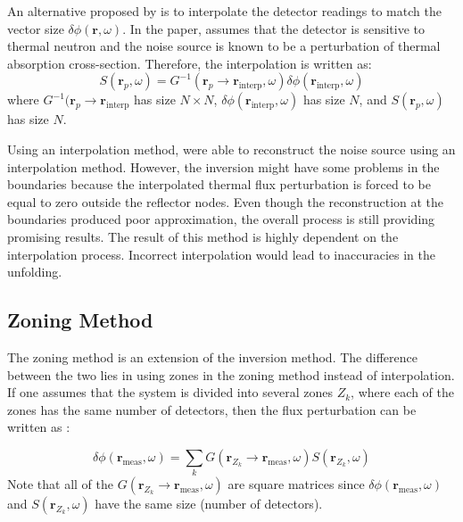 An alternative proposed by \cite{demaziereIdentificationLocalizationAbsorbers2005} is to interpolate the detector readings to match the vector size $\delta \phi (\textbf{r},\omega)$. In the paper, \cite{demaziereIdentificationLocalizationAbsorbers2005} assumes that the detector is sensitive to thermal neutron and the noise source is known to be a perturbation of thermal absorption cross-section. Therefore, the interpolation is written as:
\begin{equation}
    S(\textbf{r}_p, \omega) = G^{-1}(\textbf{r}_p \rightarrow \textbf{r}_{\text{interp}}, \omega) \delta \phi (\textbf{r}_{\text{interp}},\omega) 
    \label{eq:source_inversion_matrix2}
\end{equation}
where $G^{-1}(\textbf{r}_p \rightarrow \textbf{r}_{\text{interp}}$ has size $N \times N$, $\delta \phi (\textbf{r}_{\text{interp}},\omega)$ has size $N$, and $S(\textbf{r}_p, \omega)$ has size $N$.

Using an interpolation method, \cite{demaziereIdentificationLocalizationAbsorbers2005} were able to reconstruct the noise source using an interpolation method. However, the inversion might have some problems in the boundaries because the interpolated thermal flux perturbation is forced to be equal to zero outside the reflector nodes. Even though the reconstruction at the boundaries produced poor approximation, the overall process is still providing promising results. The result of this method is highly dependent on the interpolation process. Incorrect interpolation would lead to inaccuracies in the unfolding.

\subsection{Zoning Method}

The zoning method is an extension of the inversion method. The difference between the two lies in using zones in the zoning method instead of interpolation. If one assumes that the system is divided into several zones $Z_k$, where each of the zones has the same number of detectors, then the flux perturbation can be written as \cite{demaziereIdentificationLocalizationAbsorbers2005}:

\begin{equation}
    \delta \phi (\textbf{r}_{\text{meas}},\omega) = \sum_{k} G(\textbf{r}_{Z_k} \rightarrow \textbf{r}_{\text{meas}}, \omega) S(\textbf{r}_{Z_k}, \omega)
    \label{eq:zoning_definition}
\end{equation}
Note that all of the $G(\textbf{r}_{Z_k} \rightarrow \textbf{r}_{\text{meas}}, \omega)$ are square matrices since $\delta \phi (\textbf{r}_{\text{meas}},\omega)$ and $S(\textbf{r}_{Z_k}, \omega)$ have the same size (number of detectors).


